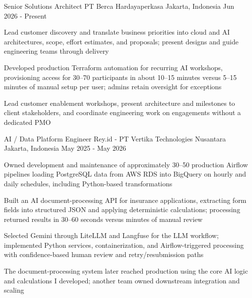 

\begin{cventries}

  \cventry
    {Senior Solutions Architect} %
    {PT Berca Hardayaperkasa} %
    {Jakarta, Indonesia} %
    {Jun 2026 - Present} %
    {
      \begin{cvitems} %
        \item {Lead customer discovery and translate business priorities into cloud and AI architectures, scope, effort estimates, and proposals; present designs and guide engineering teams through delivery}
        \item {Developed production Terraform automation for recurring AI workshops, provisioning access for 30--70 participants in about 10--15 minutes versus 5--15 minutes of manual setup per user; admins retain oversight for exceptions}
        \item {Lead customer enablement workshops, present architecture and milestones to client stakeholders, and coordinate engineering work on engagements without a dedicated PMO}
      \end{cvitems}
    }

  \cventry
    {AI / Data Platform Engineer} %
    {Rey.id - PT Vertika Technologies Nusantara} %
    {Jakarta, Indonesia} %
    {May 2025 - May 2026} %
    {
      \begin{cvitems} %
        \item {Owned development and maintenance of approximately 30--50 production Airflow pipelines loading PostgreSQL data from AWS RDS into BigQuery on hourly and daily schedules, including Python-based transformations}
        \item {Built an AI document-processing API for insurance applications, extracting form fields into structured JSON and applying deterministic calculations; processing returned results in 30--60 seconds versus minutes of manual review}
        \item {Selected Gemini through LiteLLM and Langfuse for the LLM workflow; implemented Python services, containerization, and Airflow-triggered processing with confidence-based human review and retry/resubmission paths}
        \item {The document-processing system later reached production using the core AI logic and calculations I developed; another team owned downstream integration and scaling}
      \end{cvitems}
    }


\end{cventries}
